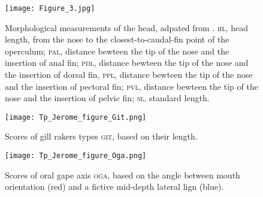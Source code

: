 \begin{figure} [!htbp]
	\begin{center}
		\texttt{[image: Figure\_3.jpg]}
		\caption[Petite légende]{Morphological measurements of the head, adpated from \citet{keat-chuanng2017,habib2019}. \textsc{hl}, head length, from the nose to the closest-to-caudal-fin point of the operculum; \textsc{pal}, distance bewteen the tip of the nose and the insertion of anal fin; \textsc{pdl}, distance bewteen the tip of the nose and the insertion of dorsal fin, \textsc{ppl}, distance bewteen the tip of the nose and the insertion of pectoral fin; \textsc{pvl}, distance bewteen the tip of the nose and the insertion of pelvic fin;  \textsc{sl}, standard length.}
		\label{fig:app3}
	\end{center}
	
\end{figure}

\begin{figure} [!htbp]
	\begin{center}
	\begin{minipage}{0.45\textwidth}
		\centering
		\texttt{[image: Tp\_Jerome\_figure\_Git.png]}
		\caption[Petite légende]{Scores of gill rakers types \textsc{git}, based on their length.}
		\label{fig:app4}
	\end{minipage}\hfill
	\begin{minipage}{0.45\textwidth}
		\centering
		\texttt{[image: Tp\_Jerome\_figure\_Oga.png]}
		\caption[Petite légende]{Scores of oral gape axis \textsc{oga}, based on the angle between mouth orientation (red) and a fictive mid-depth lateral lign (blue).}
		\label{fig:app5}
	\end{minipage}
	\end{center}
	
\end{figure}
